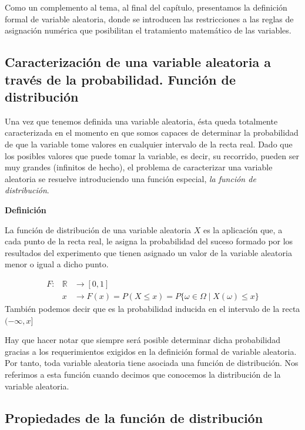 \documentclass[
]{article}
\begin{document}
Como un complemento al tema, al final del capítulo, presentamos la
definición formal de variable aleatoria, donde se introducen las
restricciones a las reglas de asignación numérica que posibilitan el
tratamiento matemático de las variables.

\subsection{Caracterización de una variable aleatoria a través de la probabilidad. Función de distribución}\label{caracterizaciuxf3n-de-una-variable-aleatoria-a-travuxe9s-de-la-probabilidad.-funciuxf3n-de-distribuciuxf3n}

Una vez que tenemos definida una variable aleatoria, ésta queda
totalmente caracterizada en el momento en que somos capaces de
determinar la probabilidad de que la variable tome valores en cualquier
intervalo de la recta real. Dado que los posibles valores que puede
tomar la variable, es decir, su recorrido, pueden ser muy grandes
(infinitos de hecho), el problema de caracterizar una variable aleatoria
se resuelve introduciendo una función especial, \emph{la función de
distribución}.

\textbf{Definición}

La función de distribución de una variable aleatoria \(X\) es la
aplicación que, a cada punto de la recta real, le asigna la probabilidad
del suceso formado por los resultados del experimento que tienen
asignado un valor de la variable aleatoria menor o igual a dicho punto.

\[
\begin{array}{rll}
F: & \mathbb{R} & \rightarrow[0,1] \\
& x & \rightarrow F(x)=P(X \leq x)=P\{\omega \in \Omega \mid X(\omega) \leq x\}
\end{array}
\] También podemos decir que es la probabilidad inducida en el intervalo
de la recta \((-\infty, x]\)

Hay que hacer notar que siempre será posible determinar dicha
probabilidad gracias a los requerimientos exigidos en la definición
formal de variable aleatoria. Por tanto, toda variable aleatoria tiene
asociada una función de distribución. Nos referimos a esta función
cuando decimos que conocemos la distribución de la variable aleatoria.

\subsection{Propiedades de la función de distribución}\label{propiedades-de-la-funciuxf3n-de-distribuciuxf3n}
\end{document}
